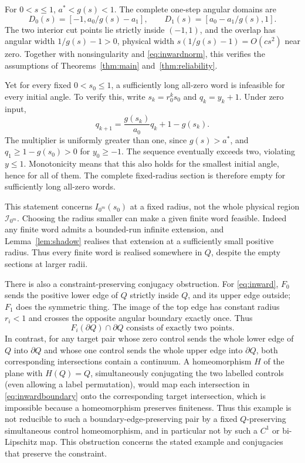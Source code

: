 \documentclass[11pt]{amsart}
\theoremstyle{definition}
\theoremstyle{remark}
\numberwithin{equation}{section}
\begin{document}
For \(0<s\le1\), \(a^*<g(s)<1\). The complete one-step angular
domains are
\begin{equation}
D_0(s)=[-1,a_0/g(s)-a_1],\qquad
 D_1(s)=[a_0-a_1/g(s),1].                                   \label{eq:inwarddomains}
\end{equation}
The two interior cut points lie strictly inside \((-1,1)\), and the overlap
has angular width \(1/g(s)-1>0\), physical width
\(s(1/g(s)-1)=O(cs^2)\) near zero. Together with nonsingularity
and \eqref{eq:inwardnorm}, this verifies the assumptions of
Theorems~\ref{thm:main} and~\ref{thm:reliability}.

Yet for every fixed \(0<s_0\le1\), a sufficiently long all-zero word
is infeasible for every initial angle. To verify this, write
\(s_k=r_0^ks_0\) and \(q_k=y_k+1\). Under zero input,
\begin{equation}
q_{k+1}=\frac{g(s_k)}{a_0}q_k+1-g(s_k).                    \label{eq:inwardrecursion}
\end{equation}
The multiplier is uniformly greater than one, since
\(g(s)>a^*\), and \(q_1\ge1-g(s_0)>0\) for \(y_0\ge-1\).
The sequence eventually exceeds two, violating \(y\le1\).
Monotonicity means that this also holds for the smallest initial
angle, hence for all of them. The complete fixed-radius section
is therefore empty for sufficiently long all-zero words.

This statement concerns \(I_{0^m}(s_0)\) at a fixed radius, not the
whole physical region \(\mathcal I_{0^m}\). Choosing the radius smaller
can make a given finite word feasible. Indeed any finite word admits
a bounded-run infinite extension, and Lemma~\ref{lem:shadow} realises that
extension at a sufficiently small positive radius. Thus every finite
word is realised somewhere in $Q$, despite the empty sections at
larger radii.

There is also a constraint-preserving conjugacy obstruction.
For \eqref{eq:inward}, \(F_0\) sends the positive lower edge of $Q$ strictly
inside $Q$, and its upper edge outside; \(F_1\) does the symmetric
thing. The image of the top edge has constant radius \(r_i<1\)
and crosses the opposite angular boundary exactly once. Thus
\begin{equation}
F_i(\partial Q)\cap\partial Q
                  \text{ consists of exactly two points}.  \label{eq:inwardboundary}
\end{equation}
In contrast, for any target pair whose zero control sends the whole
lower edge of $Q$ into $\partial Q$ and whose one control sends the
whole upper edge into $\partial Q$, both corresponding intersections
contain a continuum. A homeomorphism \(H\) of the plane with
\(H(Q)=Q\), simultaneously conjugating the two labelled controls
(even allowing a label permutation), would map each intersection
in \eqref{eq:inwardboundary} onto the corresponding target intersection,
which is impossible because a homeomorphism preserves finiteness.
Thus this example is not reducible to
such a boundary-edge-preserving pair by a fixed $Q$-preserving simultaneous
control homeomorphism, and in particular not by such a \(C^1\)
or bi-Lipschitz map. This obstruction concerns the stated example
and conjugacies that preserve the constraint.
\end{document}
